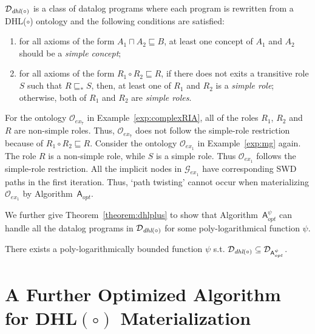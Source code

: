 \documentclass[final,1p,times]{elsarticle}
\begin{document}
\begin{definition}\label{def:dhlplus}
$\mathcal{D}_{\textit{\text{dhl}}(\circ)}$ is a class of datalog programs where each program
is rewritten from a DHL($\circ$) ontology and the following
conditions are satisfied:
\begin{enumerate}[leftmargin=4ex,label=\arabic*.]
\item for all axioms of the form $A_1\sqcap A_2\sqsubseteq B$,
    at least one concept of $A_1$ and $A_2$ should be a \emph{simple concept};
\item for all axioms of the form $R_1\circ R_2\sqsubseteq R$,
    if there does not exits a transitive role $S$ such that $R\sqsubseteq_* S$, then,
    at least one of $R_1$ and $R_2$ is a \emph{simple role}; otherwise, both of $R_1$ and $R_2$ are \emph{simple roles}.
\end{enumerate}
\end{definition}

\begin{example}
For the ontology $\mathcal{O}_{ex_7}$ in Example~\ref{exp:complexRIA}, all of the roles
$R_1$, $R_2$ and $R$ are non-simple roles. Thus, $\mathcal{O}_{ex_7}$ does not follow
the simple-role restriction because of $R_1\circ R_2\sqsubseteq R$.
Consider the ontology $\mathcal{O}_{ex_1}$
in Example~\ref{exp:mg} again. The role $R$ is a non-simple role, while $S$ is a simple role.
Thus $\mathcal{O}_{ex_1}$ follows the simple-role restriction. All the implicit nodes
in $\mathcal{G}_{ex_1}$ have corresponding SWD paths in the first iteration.
Thus, `path twisting' cannot occur when materializing $\mathcal{O}_{ex_1}$ by Algorithm~$\mathsf{A}_{opt}$.
\end{example}

We further give Theorem~\ref{theorem:dhlplus} to show that Algorithm~$\mathsf{A}_{opt}^{\psi}$ can handle
all the datalog programs in $\mathcal{D}_{\textit{\text{dhl}}(\circ)}$ for some poly-logarithmical function $\psi$.

\begin{theorem}\label{theorem:dhlplus}
There exists a poly-logarithmically bounded function $\psi$ s.t. $\mathcal{D}_{\textit{\text{dhl}}(\circ)}\subseteq\mathcal{D}_{\mathsf{A}_{opt}^{\psi}}$.
\end{theorem}


\section{A Further Optimized Algorithm for DHL$(\circ)$ Materialization}
\label{sec:practicalAlg}
\end{document}
